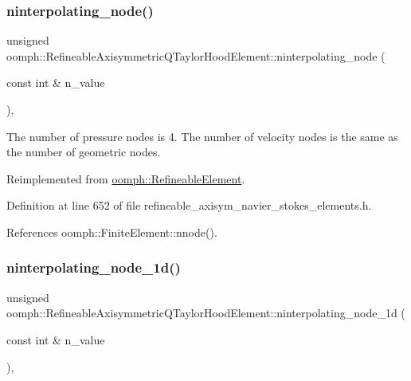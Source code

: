 \subsubsection{\texorpdfstring{ninterpolating\+\_\+node()}{ninterpolating\_node()}}
{\footnotesize\ttfamily unsigned oomph\+::\+Refineable\+Axisymmetric\+Q\+Taylor\+Hood\+Element\+::ninterpolating\+\_\+node (\begin{DoxyParamCaption}\item[{const int \&}]{n\+\_\+value }\end{DoxyParamCaption})\hspace{0.3cm}{\ttfamily [inline]}, {\ttfamily [virtual]}}



The number of pressure nodes is 4. The number of velocity nodes is the same as the number of geometric nodes. 



Reimplemented from \hyperlink{classoomph_1_1RefineableElement_a8b1b5031b55141567ba24913a21534f4}{oomph\+::\+Refineable\+Element}.



Definition at line 652 of file refineable\+\_\+axisym\+\_\+navier\+\_\+stokes\+\_\+elements.\+h.



References oomph\+::\+Finite\+Element\+::nnode().

\mbox{\label{classoomph_1_1RefineableAxisymmetricQTaylorHoodElement_a7ceb3cf8da736561a0536aec2527ccd7}} 
\subsubsection{\texorpdfstring{ninterpolating\+\_\+node\+\_\+1d()}{ninterpolating\_node\_1d()}}
{\footnotesize\ttfamily unsigned oomph\+::\+Refineable\+Axisymmetric\+Q\+Taylor\+Hood\+Element\+::ninterpolating\+\_\+node\+\_\+1d (\begin{DoxyParamCaption}\item[{const int \&}]{n\+\_\+value }\end{DoxyParamCaption})\hspace{0.3cm}{\ttfamily [inline]}, {\ttfamily [virtual]}}



